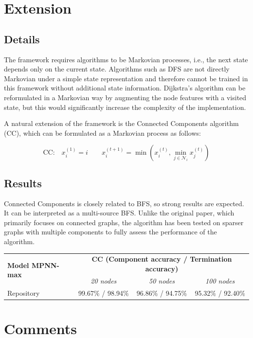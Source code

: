 \documentclass[11pt, a4paper]{article}
\begin{document}
\section{Extension}

\subsection{Details}

The framework requires algorithms to be Markovian processes, i.e., the next state depends only on the current state. Algorithms such as DFS are not directly Markovian under a simple state representation and therefore cannot be trained in this framework without additional state information. Dijkstra's algorithm can be reformulated in a Markovian way by augmenting the node features with a visited state, but this would significantly increase the complexity of the implementation.

A natural extension of the framework is the Connected Components algorithm (CC), which can be formulated as a Markovian process as follows:

\[
\text{CC:} \quad x_i^{(1)} = i 
\qquad
x_i^{(t+1)} = \min \left( x_i^{(t)}, \min_{j \in \mathcal{N}_i} x_j^{(t)} \right)
\]

\subsection{Results}

Connected Components is closely related to BFS, so strong results are expected. It can be interpreted as a multi-source BFS. Unlike the original paper, which primarily focuses on connected graphs, the algorithm has been tested on sparser graphs with multiple components to fully assess the performance of the algorithm.

\begin{table}[H]
\centering
\begin{tabular}{lccc}
\toprule
\multirow{2}{*}{\textbf{Model MPNN-max}} &
\multicolumn{3}{c}{\textbf{CC (Component accuracy / Termination accuracy)}} \\
& \textit{20 nodes} & \textit{50 nodes} & \textit{100 nodes} \\
\midrule
Repository
& 99.67\% / 98.94\%
& 96.86\% / 94.75\%
& 95.32\% / 92.40\% \\
\bottomrule
\end{tabular}
\end{table}

\section{Comments}
\end{document}
